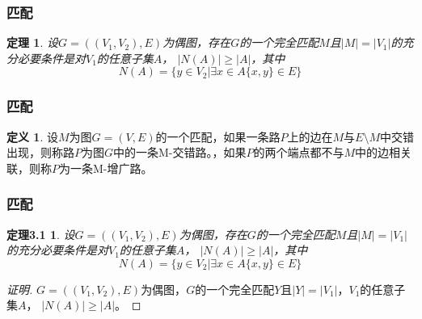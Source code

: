 \documentclass{beamer}
\newtheorem{Thm}{定理}[section]
\newtheorem*{Thm3.1}{定理3.1}
\theoremstyle{definition}
\newtheorem{Def}{定义}[section]
\theoremstyle{example}
\begin{document}
\begin{CJK}{UTF8}{gbsn}
\begin{frame}
\end{frame}


\begin{frame}
  \frametitle{匹配}
  \begin{Thm}\justifying\let\raggedright\justifying
    设$G=((V_1,V_2),E)$为偶图，存在$G$的一个完全匹配$M$且$|M| = |V_1|$的充分必要条件是对$V_1$的任意子集$A$， $|N(A)| \geq |A|$，其中\[N(A) = \{y\in V_2|\exists x \in A \{x,y\} \in E\}\]
  \end{Thm}

\end{frame}

\begin{frame}
  \frametitle{匹配}
  \begin{Def}\justifying\let\raggedright\justifying
  设$M$为图$G=(V,E)$的一个匹配，如果一条路$P$上的边在$M$与$E\setminus M$中交错出现，则称路$P$为图$G$中的一条\alert{M-交错路}。，如果$P$的两个端点都不与$M$中的边相关联，则称$P$为一条\alert{M-增广路}。
  \end{Def}
\end{frame}
\begin{frame}
  \frametitle{匹配}
  \begin{Thm3.1}\justifying\let\raggedright\justifying
    设$G=((V_1,V_2),E)$为偶图，存在$G$的一个完全匹配$M$且$|M| = |V_1|$的充分必要条件是对$V_1$的任意子集$A$， $|N(A)| \geq |A|$，其中\[N(A) = \{y\in V_2|\exists x \in A \{x,y\} \in E\}\]
  \end{Thm3.1}\pause
  \begin{proof}[证明]
\justifying\let\raggedright\justifying
{}$G=((V_1,V_2),E)$为偶图，$G$的一个完全匹配$Y$且$|Y| = |V_1|$，$V_1$的任意子集$A$， \pause$|N(A)| \geq |A|$。
    \renewcommand{\qedsymbol}{}    
\end{proof}  
\end{frame}

   

\end{CJK}
\end{document}

